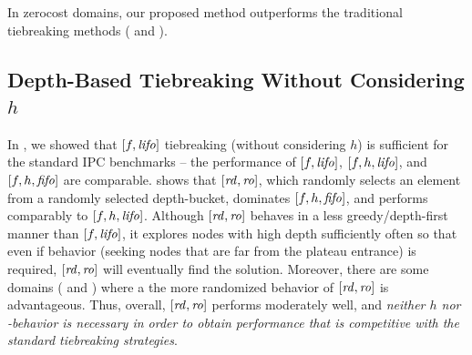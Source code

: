 

In zerocost domains, our proposed method outperforms the traditional
tiebreaking methods ( and ).



%  
% 
%  


\subsection{Depth-Based Tiebreaking Without Considering $h$}

In , we showed that $[f,{\mbox{\textit{lifo}}}]$ tiebreaking (without considering $h$) is
sufficient for the standard IPC benchmarks -- the performance of $[f,{\mbox{\textit{lifo}}}]$, $[f,h,{\mbox{\textit{lifo}}}]$, and $[f,h,{\mbox{\textit{fifo}}}]$ are comparable.
 shows that $[{\mbox{\textit{rd}}},{\mbox{\textit{ro}}}]$, which randomly selects an element from a randomly selected depth-bucket, dominates $[f,h,{\mbox{\textit{fifo}}}]$,
and performs comparably to $[f,h,{\mbox{\textit{lifo}}}]$.
Although $[{\mbox{\textit{rd}}},{\mbox{\textit{ro}}}]$ behaves in a less greedy/depth-first manner than $[f,{\mbox{\textit{lifo}}}]$, 
it explores nodes with high depth sufficiently often so that even if \lifo behavior (seeking nodes that are far from the plateau entrance) is required, $[{\mbox{\textit{rd}}},{\mbox{\textit{ro}}}]$ will eventually find the solution.
Moreover, there are some domains ( and ) where a the more randomized behavior of $[{\mbox{\textit{rd}}},{\mbox{\textit{ro}}}]$ is advantageous.
Thus, overall, $[{\mbox{\textit{rd}}},{\mbox{\textit{ro}}}]$ performs moderately well, and 
\emph{neither $h$ nor \lifo-behavior is necessary in order to obtain performance that is competitive with the standard
tiebreaking strategies}.



